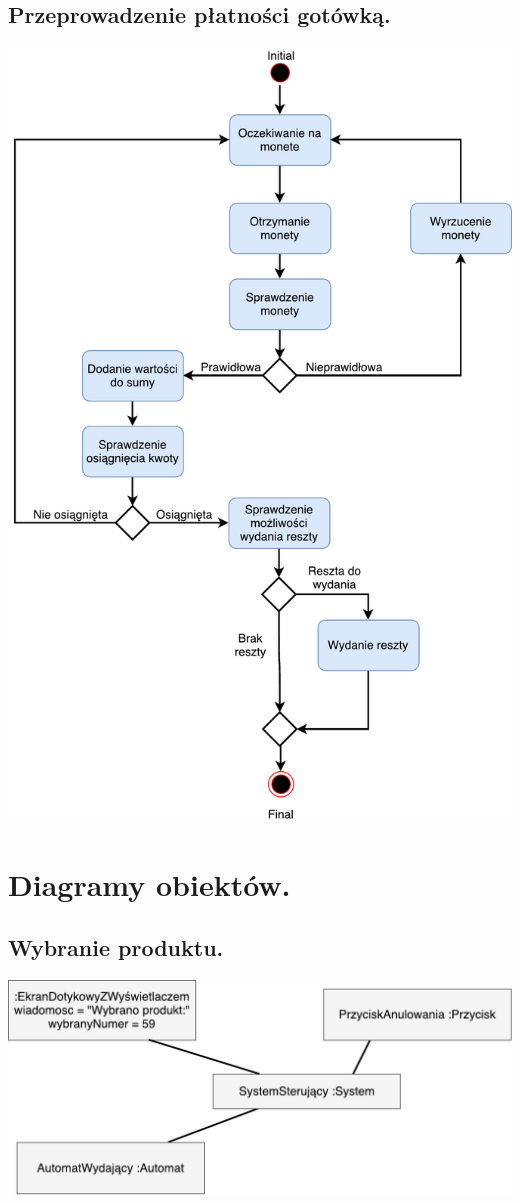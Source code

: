 \documentclass[11pt]{article}
\begin{document}
		\subsection{Przeprowadzenie płatności gotówką.}
		\begin{center}
			\includegraphics[scale=0.8]{czynnosci4.pdf}
		\end{center}
		\newpage
	\section{Diagramy obiektów.}
		\subsection{Wybranie produktu.}
		\begin{center}
			\includegraphics[scale=0.65]{obiektow1.pdf}
		\end{center}
\end{document}
